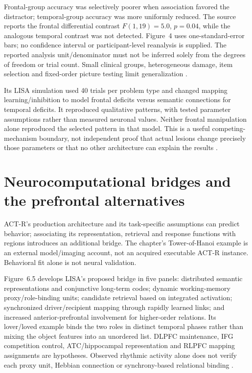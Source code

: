 Frontal-group accuracy was selectively poorer when association
favored the distractor; temporal-group accuracy was more uniformly
reduced. The source reports the frontal differential contrast
\(F(1, 19)=5.0\), \(p=0.04\), while the analogous temporal
contrast was not detected. Figure~4 uses one-standard-error bars;
no confidence interval or participant-level reanalysis is supplied.
The reported analysis unit/denominator must not be inferred solely
from the degrees of freedom or trial count. Small clinical groups,
heterogeneous damage, item selection and fixed-order picture testing
limit generalization \cite[pp.~265--268]{MorrisonEtAl2004Analogy}.

Its LISA simulation used 40 trials per problem type and changed
mapping learning/inhibition to model frontal deficits versus semantic
connections for temporal deficits. It reproduced qualitative patterns,
with tested parameter assumptions rather than measured neuronal
values. Neither frontal manipulation alone reproduced the selected
pattern in that model. This is a useful competing-mechanism
boundary, not independent proof that actual lesions change precisely
those parameters or that no other architecture can explain the
results \cite[pp.~266, 268--270]{MorrisonEtAl2004Analogy}.

\section{Neurocomputational bridges and the prefrontal alternatives}
\label{sec:p19-ncm-models}

ACT-R's production architecture and its task-specific assumptions
can predict behavior; associating its representation, retrieval
and response functions with regions introduces an additional
bridge. The chapter's Tower-of-Hanoi example is an external
model/imaging account, not an acquired executable ACT-R instance.
Behavioral fit alone is not neural validation.

Figure~6.5 develops LISA's proposed bridge in five panels: distributed
semantic representations and conjunctive long-term codes; dynamic
working-memory proxy/role-binding units; candidate retrieval based
on integrated activation; synchronized driver/recipient mapping
through rapidly learned links; and increased anterior-prefrontal
involvement for higher-order relations. Its lover/loved example
binds the two roles in distinct temporal phases rather than mixing
the object features into an unordered list. DLPFC maintenance,
IFG competition control, ATC/hippocampal representation and
RLPFC mapping assignments are hypotheses. Observed rhythmic
activity alone does not verify each proxy unit, Hebbian connection
or synchrony-based relational binding
\cite[pp.~82--84 and fig.~6.5]{MorrisonKnowlton2012Methods}.

